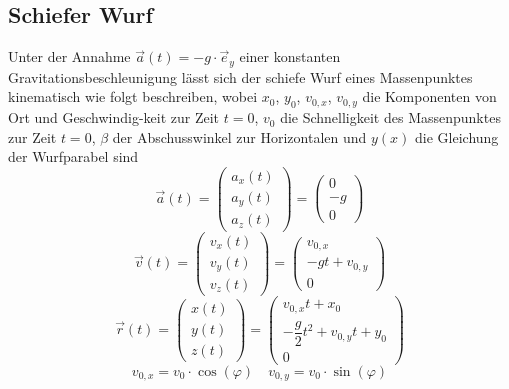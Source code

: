\subsection{Schiefer Wurf}
Unter der Annahme $\overrightarrow{a}\left(t\right)=-g\cdot \overrightarrow{e}_y$ einer konstanten Gravitationsbeschleunigung lässt sich der schiefe Wurf eines Massenpunktes kinematisch wie folgt beschreiben, wobei $x_0$, $y_0$, $v_{0,x}$, $v_{0,y}$ die Komponenten von Ort und Geschwindig-keit zur Zeit $t=0$, $v_0$ die Schnelligkeit des Massenpunktes zur Zeit $t=0$, $\beta$ der Abschusswinkel zur Horizontalen und $y\left(x\right)$ die Gleichung der Wurfparabel sind 
\begin{equation}
\boxed{\overrightarrow{a}\left(t\right)=\begin{pmatrix}a_x\left(t\right)\\a_y\left(t\right)\\a_z\left(t\right)\end{pmatrix}=\begin{pmatrix}0\\-g\\0\end{pmatrix}}
\end{equation}
\begin{equation}
\boxed{\overrightarrow{v}\left(t\right)=\begin{pmatrix}v_x\left(t\right)\\v_y\left(t\right)\\v_z\left(t\right)\end{pmatrix}=\begin{pmatrix}v_{0,x}\\-gt+v_{0,y}\\0\end{pmatrix}}
\end{equation}
\begin{equation}
\boxed{\overrightarrow{r}\left(t\right)=\begin{pmatrix}x\left(t\right)\\y\left(t\right)\\z\left(t\right)\end{pmatrix}=\begin{pmatrix}v_{0,x}t+x_0\\-\dfrac{g}{2}t^2+v_{0,y}t+y_0\\0\end{pmatrix}}
\end{equation}
\begin{equation}
\boxed{v_{0,x}=v_0\cdot \cos\left(\varphi\right)}\quad \boxed{v_{0,y}=v_0\cdot \sin\left(\varphi\right)}
\end{equation}
